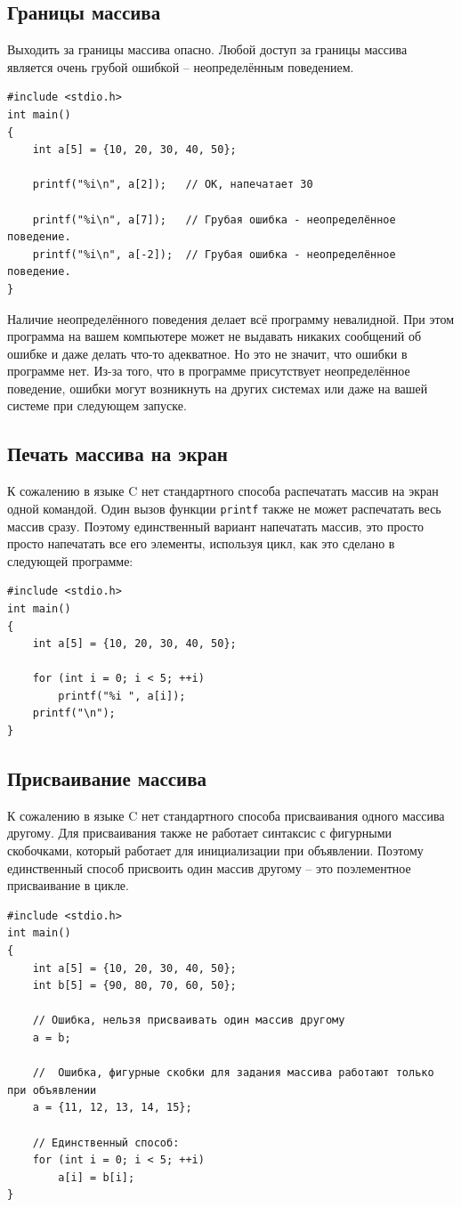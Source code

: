 \documentclass[10pt]{article}
\begin{document}
\subsection*{Границы массива}
Выходить за границы массива опасно. Любой доступ за границы массива является очень грубой ошибкой -- неопределённым поведением.
\begin{lstlisting}
#include <stdio.h>
int main()
{
	int a[5] = {10, 20, 30, 40, 50};
	
	printf("%i\n", a[2]); 	// ОК, напечатает 30
	
	printf("%i\n", a[7]); 	// Грубая ошибка - неопределённое поведение.
	printf("%i\n", a[-2]); 	// Грубая ошибка - неопределённое поведение.
}
\end{lstlisting}
Наличие неопределённого поведения делает всё программу невалидной. При этом программа на вашем компьютере может не выдавать никаких сообщений об ошибке и даже делать что-то адекватное. Но это не значит, что ошибки в программе нет. Из-за того, что в программе присутствует неопределённое поведение, ошибки могут возникнуть на других системах или даже на вашей системе при следующем запуске. 

\subsection*{Печать массива на экран}
К сожалению в языке C нет стандартного способа распечатать массив на экран одной командой.
Один вызов функции \texttt{printf} также не может распечатать весь массив сразу.
Поэтому единственный вариант напечатать массив, это просто просто напечатать все его элементы, используя цикл, как это сделано в следующей программе:
\begin{lstlisting}
#include <stdio.h>
int main()
{
    int a[5] = {10, 20, 30, 40, 50};

    for (int i = 0; i < 5; ++i)
        printf("%i ", a[i]);
    printf("\n");
}
\end{lstlisting}

\subsection*{Присваивание массива}
К сожалению в языке C нет стандартного способа присваивания одного массива другому. Для присваивания также не работает синтаксис с фигурными скобочками, который работает для инициализации при объявлении. Поэтому единственный способ присвоить один массив другому -- это поэлементное присваивание в цикле.
\begin{lstlisting}
#include <stdio.h>
int main()
{
    int a[5] = {10, 20, 30, 40, 50};
    int b[5] = {90, 80, 70, 60, 50};

	// Ошибка, нельзя присваивать один массив другому
	a = b;	
	
	//	Ошибка, фигурные скобки для задания массива работают только при объявлении			
    a = {11, 12, 13, 14, 15};	
    
    // Единственный способ:
    for (int i = 0; i < 5; ++i)
    	a[i] = b[i];
}
\end{lstlisting}
\end{document}
